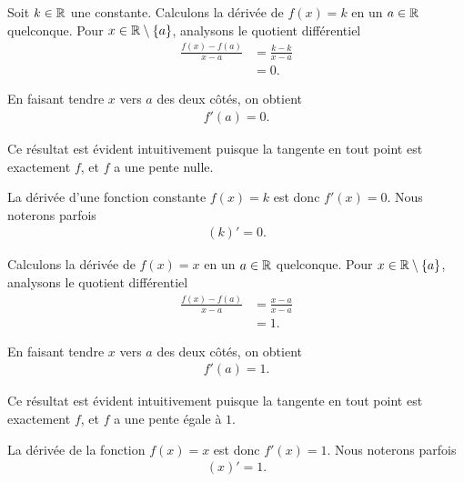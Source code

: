 \documentclass[main.tex]{subfiles}
\begin{document}
\begin{example}

    Soit $k \in \mathbb{R}$ une constante.
    Calculons la dérivée de $f(x) = k$ en un $a \in \mathbb{R}$ quelconque.
    Pour $x \in \mathbb{R} \setminus \{a\}$,
    analysons le quotient différentiel
    \begin{align}
        \frac {f(x) - f(a)}{x - a}
        &= \frac {k-k}{x - a}\\
        &= 0.
    \end{align}

    En faisant tendre $x$ vers $a$ des deux côtés,
    on obtient
    \begin{align}
        f'(a) = 0.
    \end{align}

    Ce résultat est évident intuitivement
    puisque la tangente en tout point est exactement $f$,
    et $f$ a une pente nulle.
    \begin{plot}{0.5}{-6}{-1}{6}{3}
    \end{plot}
    
    La dérivée d'une fonction constante $f(x) = k$ est donc $f'(x) = 0$.
    Nous noterons parfois
    \begin{align}
        (k)'=0.
    \end{align}

\end{example}

\begin{example}
    [Dérivée de $x$]

    Calculons la dérivée de $f(x) = x$ en un $a \in \mathbb{R}$ quelconque.
    Pour $x \in \mathbb{R} \setminus \{a\}$,
    analysons le quotient différentiel
    \begin{align}
        \frac {f(x) - f(a)}{x - a}
        &= \frac {x - a}{x - a}\\
        &= 1.
    \end{align}

    En faisant tendre $x$ vers $a$ des deux côtés,
    on obtient
    \begin{align}
        f'(a) = 1.
    \end{align}

    Ce résultat est évident intuitivement
    puisque la tangente en tout point est exactement $f$,
    et $f$ a une pente égale à $1$.
    \begin{plot}{0.25}{-6}{-6}{6}{6}
    \end{plot}
    
    La dérivée de la fonction $f(x) = x$ est donc $f'(x) = 1$.
    Nous noterons parfois
    \begin{align}
        (x)'=1.
    \end{align}
\end{example}
\end{document}
